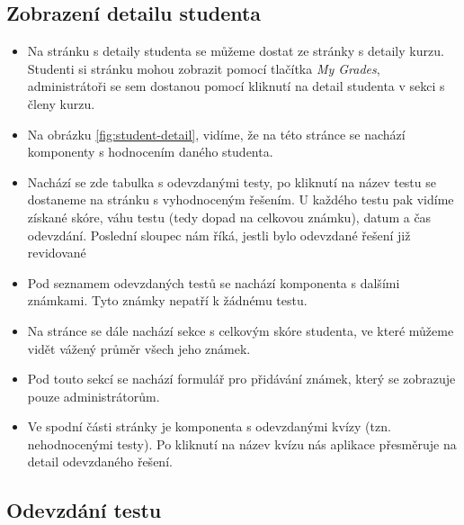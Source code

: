 \subsection{Zobrazení detailu studenta}

\begin{itemize}
	\item Na stránku s detaily studenta se můžeme dostat ze stránky s detaily kurzu. Studenti si stránku mohou zobrazit pomocí tlačítka \textit{My Grades}, administrátoři se sem dostanou pomocí kliknutí na detail studenta v sekci s členy kurzu.
	\item Na obrázku \ref{fig:student-detail}, vidíme, že na této stránce se nachází komponenty s hodnocením daného studenta. 
	\item Nachází se zde tabulka s odevzdanými testy, po kliknutí na název testu se dostaneme na stránku s vyhodnoceným řešením. U každého testu pak vidíme získané skóre, váhu testu (tedy dopad na celkovou známku), datum a čas odevzdání. Poslední sloupec nám říká, jestli bylo odevzdané řešení již revidované
	\item Pod seznamem odevzdaných testů se nachází komponenta s dalšími známkami. Tyto známky nepatří k žádnému testu. 
	\item Na stránce se dále nachází sekce s celkovým skóre studenta, ve které můžeme vidět vážený průměr všech jeho známek.
	\item Pod touto sekcí se nachází formulář pro přidávání známek, který se zobrazuje pouze administrátorům.
	\item Ve spodní části stránky je komponenta s odevzdanými kvízy (tzn. nehodnocenými testy). Po kliknutí na název kvízu nás aplikace přesměruje na detail odevzdaného řešení.
\end{itemize}

\subsection{Odevzdání testu}

